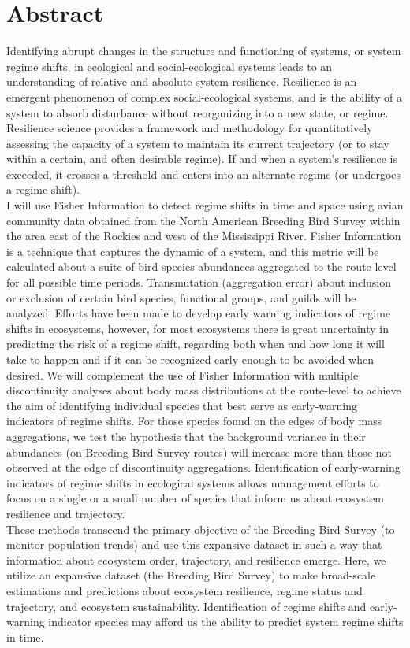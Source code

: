 \documentclass[12pt,twoside,openany]{reedthesis}
\begin{document}
\hypertarget{abstract}{%
\chapter*{Abstract}\label{abstract}}

Identifying abrupt changes in the structure and functioning of systems, or system regime shifts, in ecological and social-ecological systems leads to an understanding of relative and absolute system resilience. Resilience is an emergent phenomenon of complex social-ecological systems, and is the ability of a system to absorb disturbance without reorganizing into a new state, or regime. Resilience science provides a framework and methodology for quantitatively assessing the capacity of a system to maintain its current trajectory (or to stay within a certain, and often desirable regime). If and when a system's resilience is exceeded, it crosses a threshold and enters into an alternate regime (or undergoes a regime shift).\\
I will use Fisher Information to detect regime shifts in time and space using avian community data obtained from the North American Breeding Bird Survey within the area east of the Rockies and west of the Mississippi River. Fisher Information is a technique that captures the dynamic of a system, and this metric will be calculated about a suite of bird species abundances aggregated to the route level for all possible time periods. Transmutation (aggregation error) about inclusion or exclusion of certain bird species, functional groups, and guilds will be analyzed. Efforts have been made to develop early warning indicators of regime shifts in ecosystems, however, for most ecosystems there is great uncertainty in predicting the risk of a regime shift, regarding both when and how long it will take to happen and if it can be recognized early enough to be avoided when desired. We will complement the use of Fisher Information with multiple discontinuity analyses about body mass distributions at the route-level to achieve the aim of identifying individual species that best serve as early-warning indicators of regime shifts. For those species found on the edges of body mass aggregations, we test the hypothesis that the background variance in their abundances (on Breeding Bird Survey routes) will increase more than those not observed at the edge of discontinuity aggregations. Identification of early-warning indicators of regime shifts in ecological systems allows management efforts to focus on a single or a small number of species that inform us about ecosystem resilience and trajectory.\\
These methods transcend the primary objective of the Breeding Bird Survey (to monitor population trends) and use this expansive dataset in such a way that information about ecosystem order, trajectory, and resilience emerge. Here, we utilize an expansive dataset (the Breeding Bird Survey) to make broad-scale estimations and predictions about ecosystem resilience, regime status and trajectory, and ecosystem sustainability. Identification of regime shifts and early-warning indicator species may afford us the ability to predict system regime shifts in time.
\end{document}
